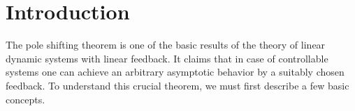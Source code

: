 \chapter*{Introduction}

The pole shifting theorem is one of the basic results of the theory of linear dynamic systems with linear feedback. It claims that in case of controllable systems one can achieve an arbitrary asymptotic behavior by a suitably chosen feedback. To understand this crucial theorem, we must first describe a few basic concepts.